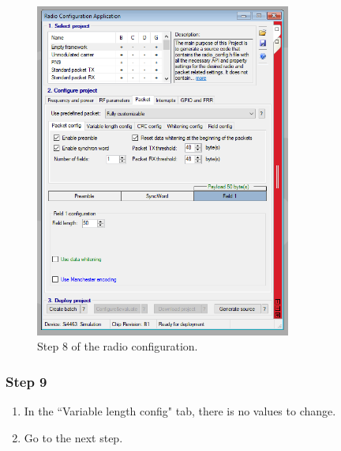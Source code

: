 \begin{figure}[!h]
	\begin{center}
		\includegraphics[width=0.75\textwidth]{figures/wds-tutorial-8.png}
		\caption{Step 8 of the radio configuration.}
		\label{fig:wds-tutorial-step-8}
	\end{center}
\end{figure}

\subsubsection{Step 9}

\begin{enumerate}
    \item In the ``Variable length config" tab, there is no values to change.
    \item Go to the next step.
\end{enumerate}

